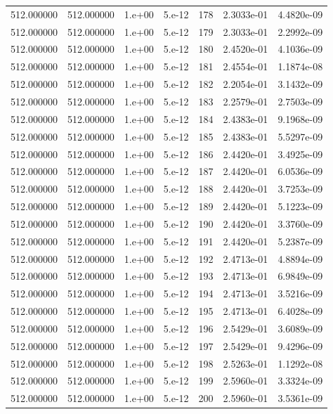 \begin{table}[htbp]
\begin{tabular}{rrrrrrr}
512.000000 & 512.000000 & 1.e+00 & 5.e-12 & 178 & 2.3033e-01 & 4.4820e-09 \\
512.000000 & 512.000000 & 1.e+00 & 5.e-12 & 179 & 2.3033e-01 & 2.2992e-09 \\
512.000000 & 512.000000 & 1.e+00 & 5.e-12 & 180 & 2.4520e-01 & 4.1036e-09 \\
512.000000 & 512.000000 & 1.e+00 & 5.e-12 & 181 & 2.4554e-01 & 1.1874e-08 \\
512.000000 & 512.000000 & 1.e+00 & 5.e-12 & 182 & 2.2054e-01 & 3.1432e-09 \\
512.000000 & 512.000000 & 1.e+00 & 5.e-12 & 183 & 2.2579e-01 & 2.7503e-09 \\
512.000000 & 512.000000 & 1.e+00 & 5.e-12 & 184 & 2.4383e-01 & 9.1968e-09 \\
512.000000 & 512.000000 & 1.e+00 & 5.e-12 & 185 & 2.4383e-01 & 5.5297e-09 \\
512.000000 & 512.000000 & 1.e+00 & 5.e-12 & 186 & 2.4420e-01 & 3.4925e-09 \\
512.000000 & 512.000000 & 1.e+00 & 5.e-12 & 187 & 2.4420e-01 & 6.0536e-09 \\
512.000000 & 512.000000 & 1.e+00 & 5.e-12 & 188 & 2.4420e-01 & 3.7253e-09 \\
512.000000 & 512.000000 & 1.e+00 & 5.e-12 & 189 & 2.4420e-01 & 5.1223e-09 \\
512.000000 & 512.000000 & 1.e+00 & 5.e-12 & 190 & 2.4420e-01 & 3.3760e-09 \\
512.000000 & 512.000000 & 1.e+00 & 5.e-12 & 191 & 2.4420e-01 & 5.2387e-09 \\
512.000000 & 512.000000 & 1.e+00 & 5.e-12 & 192 & 2.4713e-01 & 4.8894e-09 \\
512.000000 & 512.000000 & 1.e+00 & 5.e-12 & 193 & 2.4713e-01 & 6.9849e-09 \\
512.000000 & 512.000000 & 1.e+00 & 5.e-12 & 194 & 2.4713e-01 & 3.5216e-09 \\
512.000000 & 512.000000 & 1.e+00 & 5.e-12 & 195 & 2.4713e-01 & 6.4028e-09 \\
512.000000 & 512.000000 & 1.e+00 & 5.e-12 & 196 & 2.5429e-01 & 3.6089e-09 \\
512.000000 & 512.000000 & 1.e+00 & 5.e-12 & 197 & 2.5429e-01 & 9.4296e-09 \\
512.000000 & 512.000000 & 1.e+00 & 5.e-12 & 198 & 2.5263e-01 & 1.1292e-08 \\
512.000000 & 512.000000 & 1.e+00 & 5.e-12 & 199 & 2.5960e-01 & 3.3324e-09 \\
512.000000 & 512.000000 & 1.e+00 & 5.e-12 & 200 & 2.5960e-01 & 3.5361e-09 \\

\end{tabular}
\end{table}
